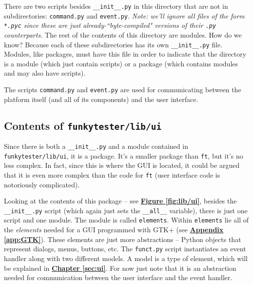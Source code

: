 \documentclass{report}
\begin{document}
There are two scripts  besides \texttt{\_\_init\_\_.py} in this directory that are not in subdirectories: \texttt{command.py} and \texttt{event.py}. \textit{Note: we'll ignore all files of the form \texttt{*.pyc} since these are just already-``byte-compiled" versions of their \texttt{.py} counterparts.} The rest of the contents of this directory are modules. How do we know? Because each of these subdirectories has its own \texttt{\_\_init\_\_.py} file. Modules, like packages, must have this file in order to indicate that the directory is a module (which just contain scripts) or a package (which contains modules and may also have scripts).

The scripts \texttt{command.py} and \texttt{event.py} are used for communicating between the platform itself (and all of its components) and the user interface.

\subsection{Contents of \texttt{funkytester/lib/ui}} \label{sec:ui_contents}
Since there is both a \texttt{\_\_init\_\_.py} and a module contained in \texttt{funkytester/lib/ui}, it is a package. It's a smaller package than \texttt{ft}, but it's no less complex. In fact, since this is where the GUI is located, it could be argued that it is even more complex than the code for \texttt{ft} (user interface code is notoriously complicated).

Looking at the contents of this package -- see \hyperref[fig:lib/ui]{\textbf{Figure \ref{fig:lib/ui}}}, besides the \texttt{\_\_init\_\_.py} script (which again just sets the \texttt{\_\_all\_\_} variable), there is just one script and one module. The module is called \texttt{elements}. Within \texttt{elements} lie all of the \textit{elements} needed for a GUI programmed with GTK+ (see \hyperref[sec:GTK]{\textbf{Appendix \ref{app:GTK}}}). These elements are just more abstractions -- Python objects that represent dialogs, menus, buttons, etc. The \texttt{funct.py} script instantiates an event handler along with two different models. A model is a type of element, which will be explained in \hyperref[sec:ui]{\textbf{Chapter \ref{sec:ui}}}. For now just note that it is an abstraction needed for communication between the user interface and the event handler.\\
\end{document}
